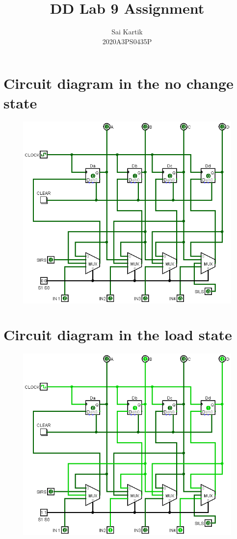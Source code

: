 \documentclass[12pt]{article}
\title{DD Lab 9 Assignment}
\author{Sai Kartik \\2020A3PS0435P}
\begin{document}
    \maketitle
    \section*{Circuit diagram in the no change state}
    \begin{figure}[ht]
        \centering
        \includegraphics[scale=0.50]{nochange.png}
        \end{figure}
    \newpage
    \section{Circuit diagram in the load state}
    \begin{figure}[ht]
        \centering
        \includegraphics[scale=0.50]{load.png}
    \end{figure}
    \newpage
\end{document}
